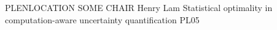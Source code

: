 	{PLENLOCATION}	%
	{SOME CHAIR}		%
	{Henry Lam}	%
	{Statistical optimality in computation-aware uncertainty quantification}	%
	{PL05}			%
	\\\hline
